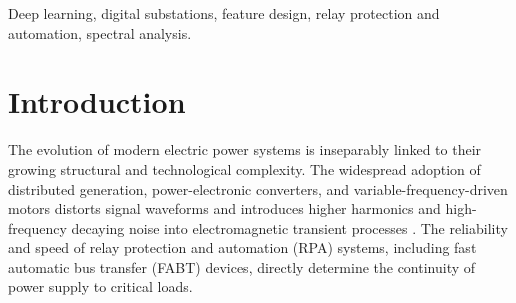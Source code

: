 \documentclass{ieeeojies}
\begin{document}
\begin{abstract}
The choice of feature space for neural-network algorithms in relay protection and automation is usually based on expert preference and lacks systematic justification from real-world data. This work presents a systematic comparison of six feature representations and seven neural-network architectures on 990 expert-verified industrial oscillograms from 6 to 35 kV power grids sampled at 1600 Hz. A full factorial grid of 9450 training runs, covering every combination of the six representations, the seven architectures, three time-sampling modes, and three complexity levels under five-fold cross-validation with five random seeds, shows that the spread of the macro-averaged F1 score across feature representations, about 0.16, exceeds the spread across architectures, about 0.11: the choice of feature space affects the result more than the choice of model. Polar spectral representations systematically outperform the direct use of instantaneous values. A ``compressed-strategy paradox'' is observed, in which a representation built from two spectral snapshots, one taken before the fault and one at the fault instant, falls short of the full 320-sample window by only 0.01 to 0.03 in macro-averaged F1 while reducing the input dimensionality by a large factor. The results yield practical engineering recommendations for designing embedded neural-network measuring elements in microprocessor-based protection terminals.
\end{abstract}
\begin{keywords}
Deep learning, digital substations, feature design, relay protection and automation, spectral analysis.
\end{keywords}
\titlepgskip=-15pt
\maketitle

\section{Introduction}

The evolution of modern electric power systems is inseparably linked to their growing structural and technological complexity. The widespread adoption of distributed generation, power-electronic converters, and variable-frequency-driven motors distorts signal waveforms and introduces higher harmonics and high-frequency decaying noise into electromagnetic transient processes \cite{ref1}. The reliability and speed of relay protection and automation (RPA) systems, including fast automatic bus transfer (FABT) devices, directly determine the continuity of power supply to critical loads.
\end{document}
